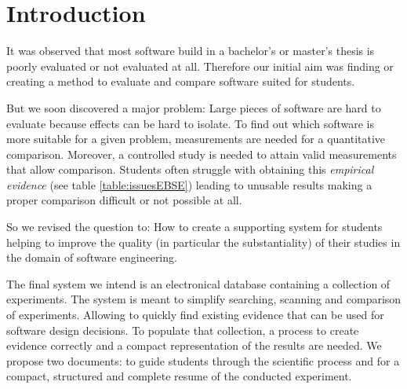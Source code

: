 

\section{Introduction}
\label{sec:introduction}

It was observed that most software build in a bachelor's or master's thesis is poorly evaluated or not evaluated at all. Therefore our initial aim was finding or creating a method to evaluate and compare software suited for students.

But we soon discovered a major problem: Large pieces of software are hard to evaluate because effects can be hard to isolate.
To find out which software  is more suitable for a given problem, measurements are needed for a quantitative comparison. Moreover, a controlled study is needed to attain valid measurements that allow comparison. Students often struggle with obtaining this \emph{empirical evidence} (see table \ref{table:issuesEBSE}) leading to unusable results making a proper comparison difficult or not possible at all. 

So we revised the question to: How to create a supporting system for students helping to improve the quality (in particular the substantiality) of their studies in the domain of software engineering.

The final system we intend is an electronical database containing a collection of experiments. The system is meant to simplify searching, scanning and comparison of experiments. Allowing to quickly find existing evidence that can be used for software design decisions. To populate that collection, a process to create evidence correctly and a compact representation of the results are needed. We propose two documents: \emph{\checklist} to guide students through the scientific process and \emph{\briefingform} for a compact, structured and complete resume of the conducted experiment. 



